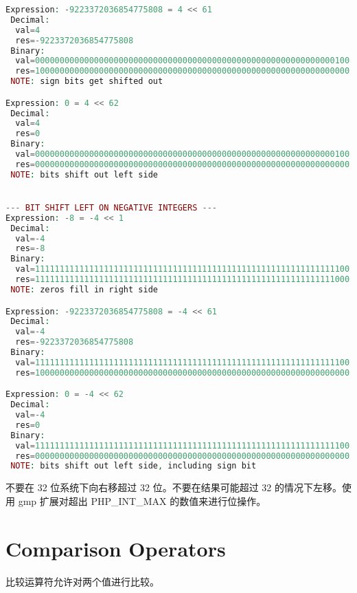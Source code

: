 \begin{lstlisting}[language=PHP]
Expression: -9223372036854775808 = 4 << 61
 Decimal:
  val=4
  res=-9223372036854775808
 Binary:
  val=0000000000000000000000000000000000000000000000000000000000000100
  res=1000000000000000000000000000000000000000000000000000000000000000
 NOTE: sign bits get shifted out

Expression: 0 = 4 << 62
 Decimal:
  val=4
  res=0
 Binary:
  val=0000000000000000000000000000000000000000000000000000000000000100
  res=0000000000000000000000000000000000000000000000000000000000000000
 NOTE: bits shift out left side


--- BIT SHIFT LEFT ON NEGATIVE INTEGERS ---
Expression: -8 = -4 << 1
 Decimal:
  val=-4
  res=-8
 Binary:
  val=1111111111111111111111111111111111111111111111111111111111111100
  res=1111111111111111111111111111111111111111111111111111111111111000
 NOTE: zeros fill in right side

Expression: -9223372036854775808 = -4 << 61
 Decimal:
  val=-4
  res=-9223372036854775808
 Binary:
  val=1111111111111111111111111111111111111111111111111111111111111100
  res=1000000000000000000000000000000000000000000000000000000000000000

Expression: 0 = -4 << 62
 Decimal:
  val=-4
  res=0
 Binary:
  val=1111111111111111111111111111111111111111111111111111111111111100
  res=0000000000000000000000000000000000000000000000000000000000000000
 NOTE: bits shift out left side, including sign bit
\end{lstlisting}


不要在 32 位系统下向右移超过 32 位。不要在结果可能超过 32 的情况下左移。使用 gmp 扩展对超出 PHP\_INT\_MAX 的数值来进行位操作。








\section{Comparison Operators}

比较运算符允许对两个值进行比较。

